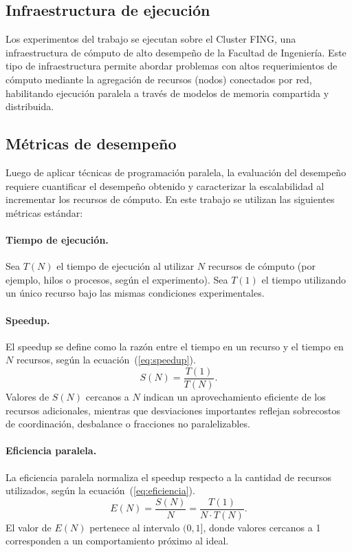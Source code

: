 \documentclass[a4paper,11pt]{book}
\newcommand{\red}[1]{\textcolor{red}{#1}}
\begin{document}
\subsection{Infraestructura de ejecución}

Los experimentos del trabajo se ejecutan sobre el Cluster FING, una infraestructura de cómputo de alto desempeño de la Facultad de Ingeniería. Este tipo de infraestructura permite abordar problemas con altos requerimientos de cómputo mediante la agregación de recursos (nodos) conectados por red, habilitando ejecución paralela a través de modelos de memoria compartida y distribuida.

\subsection{Métricas de desempeño}

Luego de aplicar técnicas de programación paralela, la evaluación del desempeño requiere cuantificar el desempeño obtenido y caracterizar la escalabilidad al incrementar los recursos de cómputo. En este trabajo se utilizan las siguientes métricas estándar:


\paragraph{Tiempo de ejecución.} Sea $T(N)$ el tiempo de ejecución al utilizar $N$ recursos de cómputo (por ejemplo, hilos o procesos, según el experimento). Sea $T(1)$ el tiempo utilizando un único recurso bajo las mismas condiciones experimentales.

\paragraph{Speedup.} El speedup se define como la razón entre el tiempo en un recurso y el tiempo en $N$ recursos, según la ecuación~(\ref{eq:speedup}).
\begin{equation}
	S(N) = \frac{T(1)}{T(N)}.
	\label{eq:speedup}
\end{equation}
Valores de $S(N)$ cercanos a $N$ indican un aprovechamiento eficiente de los recursos adicionales, mientras que desviaciones importantes reflejan sobrecostos de coordinación, desbalance o fracciones no paralelizables.

\paragraph{Eficiencia paralela.} La eficiencia paralela normaliza el speedup respecto a la cantidad de recursos utilizados, según la ecuación~(\ref{eq:eficiencia}).
\begin{equation}
	E(N) = \frac{S(N)}{N} = \frac{T(1)}{N \cdot T(N)}.
	\label{eq:eficiencia}
\end{equation}
El valor de $E(N)$ pertenece al intervalo $(0,1]$, donde valores cercanos a 1 corresponden a un comportamiento próximo al ideal.
\end{document}
